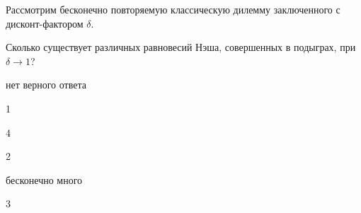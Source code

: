 
\begin{question}
Рассмотрим бесконечно повторяемую классическую дилемму заключенного с
дисконт-фактором \(\delta\).

Сколько существует различных равновесий Нэша, совершенных в подыграх,
при \(\delta \to 1\)?
\begin{answerlist}
  \item нет верного ответа
  \item 1
  \item 4
  \item 2
  \item бесконечно много
  \item 3
\end{answerlist}
\end{question}



